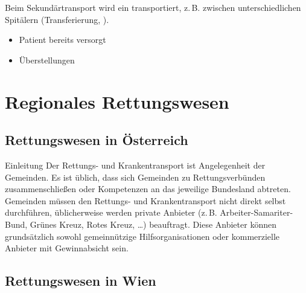 {Beim Sekundärtransport wird ein 
transportiert, z.\,B. zwischen unterschiedlichen Spitälern
(Transferierung, ).
}
{\begin{itemize}
  \item Patient bereits versorgt
  \item Überstellungen
\end{itemize}}
{}
{}
{}


\clearpage
\section{Regionales Rettungswesen}

\label{topic:regionales-rettungswesen}


\subsection{Rettungswesen in Österreich}

\Text
{Einleitung}%
{%
Der Rettungs- und Krankentransport ist Angelegenheit der
Gemeinden. Es ist üblich, dass sich Gemeinden zu
Rettungsverbünden zusammenschließen oder Kompetenzen an das
jeweilige Bundesland abtreten.  Gemeinden müssen den
Rettungs- und Krankentransport nicht direkt selbst
durchführen, üblicherweise werden private Anbieter (z.\,B.
Arbeiter-Samariter-Bund, Grünes Kreuz, Rotes Kreuz, \ldots{})
beauftragt. Diese Anbieter können grundsätzlich sowohl
gemeinnützige Hilfsorganisationen oder kommerzielle Anbieter
mit Gewinnabsicht sein.
}%



\subsection{Rettungswesen in Wien}
\label{topic:rettungswesen-wien}


